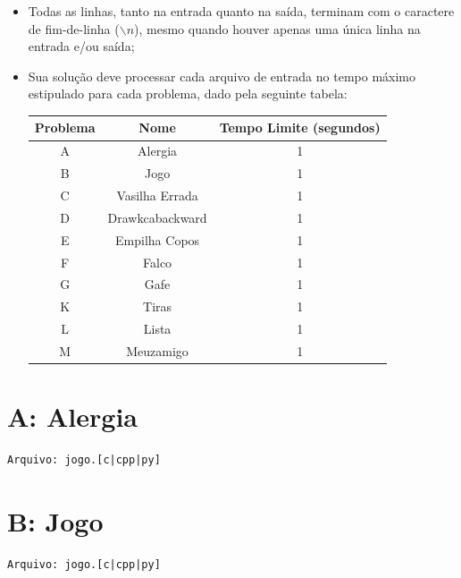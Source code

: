 \documentclass[12pt,oneside]{article} %
\begin{document}
\begin{itemize}
    \item Todas as linhas, tanto na entrada quanto na saída, terminam com o
    caractere de fim-de-linha ($\backslash n$), mesmo quando houver apenas uma única
    linha na entrada e/ou saída;

    \item Sua solução deve processar cada arquivo de entrada no tempo máximo
    estipulado para cada problema, dado pela seguinte tabela:

    \begin{table}[h]
    \centering
    \begin{tabular}{|c|c||c|}
    \hline
    \textbf{Problema} & \textbf{Nome} & \textbf{Tempo Limite (segundos)} \\
    \hline
    A & Alergia & 1 \\
    \hline
    B & Jogo & 1 \\
    \hline
    C & Vasilha Errada & 1 \\
    \hline
    D & Drawkcabackward & 1 \\
    \hline
    E & Empilha Copos & 1 \\
    \hline
    F & Falco & 1 \\
    \hline
    G & Gafe & 1 \\
    \hline
    K & Tiras & 1 \\
    \hline
    L & Lista & 1 \\
    \hline
    M & Meuzamigo & 1 \\
    \hline
    \end{tabular}
    \end{table}

\end{itemize}

\newpage
\section*{A: Alergia } %
\vspace{-0.52cm}
\noindent \begin{verbatim}Arquivo: jogo.[c|cpp|py]\end{verbatim}


\newpage
\section*{B: Jogo } %
\vspace{-0.52cm}
\noindent \begin{verbatim}Arquivo: jogo.[c|cpp|py]\end{verbatim}

\end{document}

